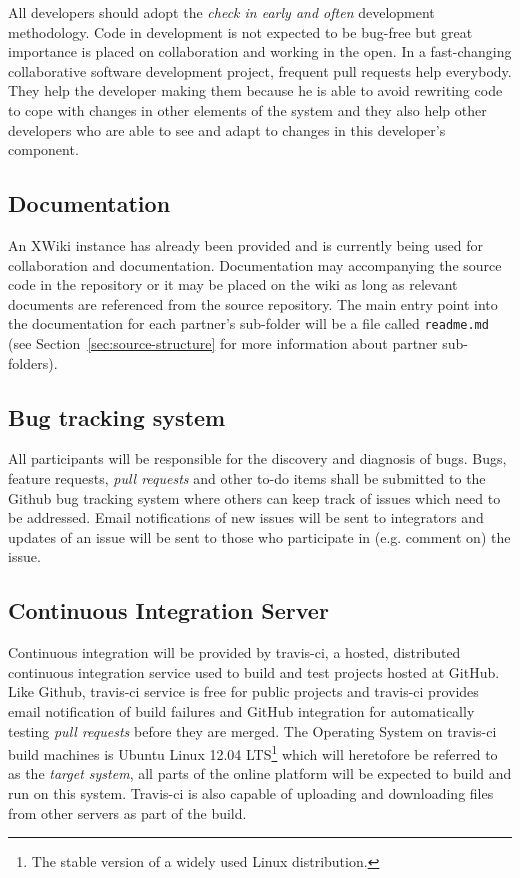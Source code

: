 \documentclass{learnpad}
\begin{document}
All developers should adopt the \emph{check in early and often} development methodology.
Code in development is not expected to be bug-free but great importance is placed on collaboration
and working in the open. In a fast-changing collaborative software development project, frequent
pull requests help everybody. They help the developer making them because he is able to avoid
rewriting code to cope with changes in other elements of the system and they also help other
developers who are able to see and adapt to changes in this developer's component.

\subsection{Documentation}
\label{sec:documentation}

An XWiki instance has already been provided and is currently being used for collaboration and
documentation. Documentation may accompanying the source code in the
repository or it may be placed on the wiki as long as relevant documents are referenced from the
source repository. The main entry point into the documentation for each partner's sub-folder will
be a file called \texttt{readme.md} (see Section~\ref{sec:source-structure} for more information
about partner sub-folders).

\subsection{Bug tracking system}
\label{sec:bug tracking-system}

All participants will be responsible for the discovery and diagnosis of bugs. Bugs, feature
requests, \emph{pull requests} and other to-do items shall be submitted to the Github bug tracking
system where others can keep track of issues which need to be addressed. Email notifications of new
issues will be sent to integrators and updates of an issue will be sent to those who participate in
(e.g. comment on) the issue.

\subsection{Continuous Integration Server}
\label{sec:ci-server}

Continuous integration will be provided by travis-ci, a hosted, distributed continuous integration
service used to build and test projects hosted at GitHub. Like Github, travis-ci service is free
for public projects and travis-ci provides email notification of build failures and GitHub
integration for automatically testing \emph{pull requests} before they are merged.
The Operating System on travis-ci build machines is Ubuntu Linux 12.04 LTS\footnote{The stable
version of a widely used Linux distribution.} which will heretofore be referred to as the
\emph{target system}, all parts of the online platform will be expected to build and run on this
system. Travis-ci is also capable of uploading and downloading files from other servers as part of
the build.
\end{document}
